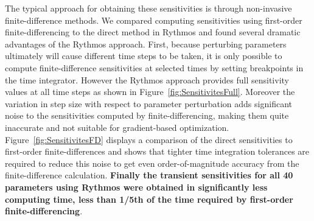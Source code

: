 \documentclass[pdf,ps2pdf,11pt]{SANDreport}
\begin{document}
The typical approach for obtaining these sensitivities is through 
non-invasive finite-difference methods.  We compared computing 
sensitivities using first-order finite-differencing to the direct method
in Rythmos and found  several dramatic advantages of the Rythmos approach.
First, because perturbing parameters ultimately will cause different time
steps to be taken, it is only possible to compute finite-difference 
sensitivities at selected times by setting breakpoints in the time integrator.
However the Rythmos approach provides full sensitivity values at all time
steps as shown in Figure~\ref{fig:SensitivitesFull}.  Moreover the variation
in step size with respect to parameter perturbation adds significant noise
to the sensitivities computed by finite-differencing, making them quite 
inaccurate and not suitable for gradient-based optimization.  
Figure~\ref{fig:SensitivitesFD} displays a comparison of the direct 
sensitivities to first-order finite-differences and shows that tighter 
time integration tolerances are required to reduce this noise to get even 
order-of-magnitude accuracy from the finite-difference calculation.  
{\bf Finally the
transient sensitivities for all 40 parameters using Rythmos were obtained in 
significantly less computing time, less than 1/5th of the time required by
first-order finite-differencing}.


\end{document}
